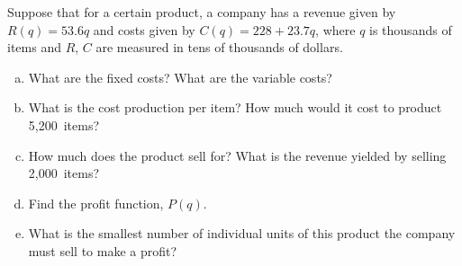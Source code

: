 \documentclass[11pt,letterpaper]{article}
\begin{document}

 Suppose that for a certain product, a company has a revenue given by $R(q)= 53.6q$ and costs given by $C(q)= 228 + 23.7q$, where $q$ is thousands of items and $R$, $C$ are measured in tens of thousands of dollars.
	\begin{enumerate}[(a)]
	\item What are the fixed costs? What are the variable costs?
	\item What is the cost production per item? How much would it cost to product 5,200~items?
	\item How much does the product sell for? What is the revenue yielded by selling 2,000~items?
	\item Find the profit function, $P(q)$.
	\item What is the smallest number of individual units of this product the company must sell to make a profit?
	\end{enumerate} \pspace
\end{document}
